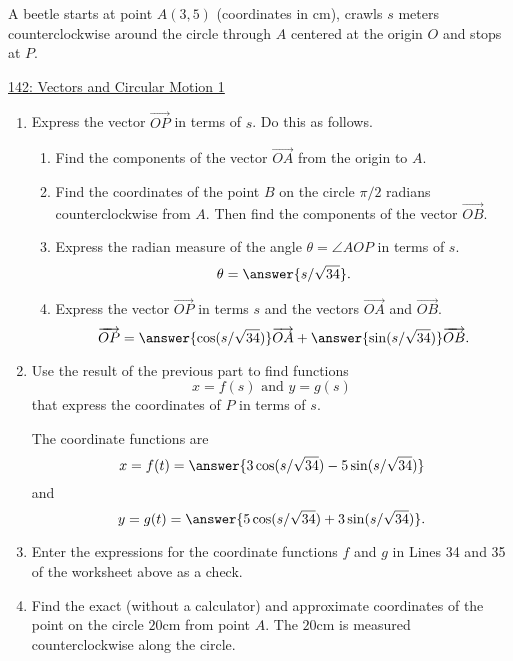 \documentclass{ximera}
\begin{document}
\begin{question} \label{QIDdfdseIFDfeD}
A beetle starts at point $A(3,5)$ (coordinates in cm), crawls $s$ meters counterclockwise around the circle through $A$ centered at the origin $O$ and stops at $P$.

\begin{onlineOnly}
    \begin{center}
\end{center}
\end{onlineOnly}

\href{https://www.desmos.com/calculator/ufyt7kkxc0}{142: Vectors and Circular Motion 1}


\begin{enumerate}
\item Express the vector $\overrightarrow{OP}$ in terms of $s$. Do this as follows.

\begin{enumerate}
\item Find the components of the vector $\overrightarrow{OA}$ from the origin to $A$.

\item Find the coordinates of the point $B$ on the circle $\pi/2$ radians counterclockwise from $A$. Then find the components of the vector $\overrightarrow{OB}$.

\item Express the radian measure of the angle $\theta = \angle AOP$ in terms of $s$.
\[
   \theta = \answer{s/\sqrt{34}} .
\]

\item Express the vector $\overrightarrow{OP}$ in terms $s$ and the vectors $\overrightarrow{OA}$ and $\overrightarrow{OB}$.
\[
      \overrightarrow{OP} = \answer{\cos (s/\sqrt{34})} \overrightarrow{OA} + \answer{\sin (s/\sqrt{34})} \overrightarrow{OB} . 
\]

\end{enumerate}

\item Use the result of the previous part to find functions
\[
 x = f(s)  \text{ and } y=g(s)
\]
that express the coordinates of $P$ in terms of $s$.

The coordinate functions are 
\[
    x = f(t) = \answer{3\cos(s/\sqrt{34}) - 5\sin(s/\sqrt{34})}
\]
and
\[
    y = g(t) = \answer{5\cos(s/\sqrt{34}) + 3\sin(s/\sqrt{34})}.
\]

\item Enter the expressions for the coordinate functions $f$ and $g$ in Lines 34 and 35 of the worksheet above as a check.

\item Find the exact (without a calculator) and approximate coordinates of the point on the circle $20$cm from point $A$. The $20$cm is measured counterclockwise along the circle.

\end{enumerate}
\end{question}
\end{document}
